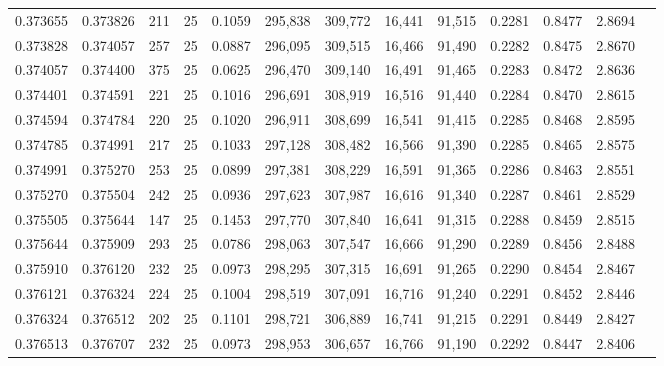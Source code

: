 \begin{tabular}{rrrrrrrrrrrrr}
0.373655 & 0.373826 &   211 &  25 &                                     0.1059 & 295,838 & 309,772 &  16,441 &  91,515 & 0.2281 & 0.8477 & 2.8694 \\
0.373828 & 0.374057 &   257 &  25 &                                     0.0887 & 296,095 & 309,515 &  16,466 &  91,490 & 0.2282 & 0.8475 & 2.8670 \\
0.374057 & 0.374400 &   375 &  25 &                                     0.0625 & 296,470 & 309,140 &  16,491 &  91,465 & 0.2283 & 0.8472 & 2.8636 \\
0.374401 & 0.374591 &   221 &  25 &                                     0.1016 & 296,691 & 308,919 &  16,516 &  91,440 & 0.2284 & 0.8470 & 2.8615 \\
0.374594 & 0.374784 &   220 &  25 &                                     0.1020 & 296,911 & 308,699 &  16,541 &  91,415 & 0.2285 & 0.8468 & 2.8595 \\
0.374785 & 0.374991 &   217 &  25 &                                     0.1033 & 297,128 & 308,482 &  16,566 &  91,390 & 0.2285 & 0.8465 & 2.8575 \\
0.374991 & 0.375270 &   253 &  25 &                                     0.0899 & 297,381 & 308,229 &  16,591 &  91,365 & 0.2286 & 0.8463 & 2.8551 \\
0.375270 & 0.375504 &   242 &  25 &                                     0.0936 & 297,623 & 307,987 &  16,616 &  91,340 & 0.2287 & 0.8461 & 2.8529 \\
0.375505 & 0.375644 &   147 &  25 &                                     0.1453 & 297,770 & 307,840 &  16,641 &  91,315 & 0.2288 & 0.8459 & 2.8515 \\
0.375644 & 0.375909 &   293 &  25 &                                     0.0786 & 298,063 & 307,547 &  16,666 &  91,290 & 0.2289 & 0.8456 & 2.8488 \\
0.375910 & 0.376120 &   232 &  25 &                                     0.0973 & 298,295 & 307,315 &  16,691 &  91,265 & 0.2290 & 0.8454 & 2.8467 \\
0.376121 & 0.376324 &   224 &  25 &                                     0.1004 & 298,519 & 307,091 &  16,716 &  91,240 & 0.2291 & 0.8452 & 2.8446 \\
0.376324 & 0.376512 &   202 &  25 &                                     0.1101 & 298,721 & 306,889 &  16,741 &  91,215 & 0.2291 & 0.8449 & 2.8427 \\
0.376513 & 0.376707 &   232 &  25 &                                     0.0973 & 298,953 & 306,657 &  16,766 &  91,190 & 0.2292 & 0.8447 & 2.8406 \\

\end{tabular}
